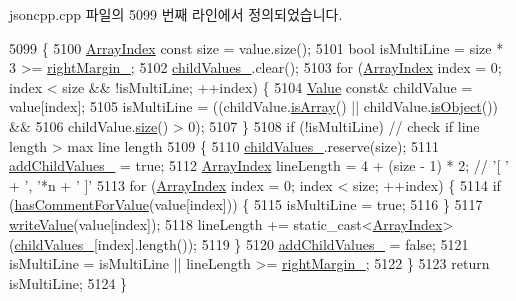 jsoncpp.\+cpp 파일의 5099 번째 라인에서 정의되었습니다.


\begin{DoxyCode}
5099                                                                \{
5100   \hyperlink{namespace_json_a8048e741f2177c3b5d9ede4a5b8c53c2}{ArrayIndex} \textcolor{keyword}{const} size = value.size();
5101   \textcolor{keywordtype}{bool} isMultiLine = size * 3 >= \hyperlink{struct_json_1_1_built_styled_stream_writer_a06a51521ccae20397f52fe3036edc602}{rightMargin\_};
5102   \hyperlink{struct_json_1_1_built_styled_stream_writer_a47d562d7874c5b1e68995bd62f575792}{childValues\_}.clear();
5103   \textcolor{keywordflow}{for} (\hyperlink{namespace_json_a8048e741f2177c3b5d9ede4a5b8c53c2}{ArrayIndex} index = 0; index < size && !isMultiLine; ++index) \{
5104     \hyperlink{class_json_1_1_value}{Value} \textcolor{keyword}{const}& childValue = value[index];
5105     isMultiLine = ((childValue.\hyperlink{class_json_1_1_value_a1627eb9d6568d6d0252fa8bb711c0a59}{isArray}() || childValue.\hyperlink{class_json_1_1_value_a8cf96c0f2a552051fcfc78ffee60e037}{isObject}()) &&
5106                         childValue.\hyperlink{class_json_1_1_value_a0ec2808e1d7efa4e9fad938d6667be44}{size}() > 0);
5107   \}
5108   \textcolor{keywordflow}{if} (!isMultiLine) \textcolor{comment}{// check if line length > max line length}
5109   \{
5110     \hyperlink{struct_json_1_1_built_styled_stream_writer_a47d562d7874c5b1e68995bd62f575792}{childValues\_}.reserve(size);
5111     \hyperlink{struct_json_1_1_built_styled_stream_writer_abed9cc31da503b48798e7cea68c42e16}{addChildValues\_} = \textcolor{keyword}{true};
5112     \hyperlink{namespace_json_a8048e741f2177c3b5d9ede4a5b8c53c2}{ArrayIndex} lineLength = 4 + (size - 1) * 2; \textcolor{comment}{// '[ ' + ', '*n + ' ]'}
5113     \textcolor{keywordflow}{for} (\hyperlink{namespace_json_a8048e741f2177c3b5d9ede4a5b8c53c2}{ArrayIndex} index = 0; index < size; ++index) \{
5114       \textcolor{keywordflow}{if} (\hyperlink{struct_json_1_1_built_styled_stream_writer_a457c2f3c1e8c952caeb60e52477d0c9a}{hasCommentForValue}(value[index])) \{
5115         isMultiLine = \textcolor{keyword}{true};
5116       \}
5117       \hyperlink{struct_json_1_1_built_styled_stream_writer_a7c9da861861e570a51b45f270c9ff150}{writeValue}(value[index]);
5118       lineLength += \textcolor{keyword}{static\_cast<}\hyperlink{namespace_json_a8048e741f2177c3b5d9ede4a5b8c53c2}{ArrayIndex}\textcolor{keyword}{>}(\hyperlink{struct_json_1_1_built_styled_stream_writer_a47d562d7874c5b1e68995bd62f575792}{childValues\_}[index].length());
5119     \}
5120     \hyperlink{struct_json_1_1_built_styled_stream_writer_abed9cc31da503b48798e7cea68c42e16}{addChildValues\_} = \textcolor{keyword}{false};
5121     isMultiLine = isMultiLine || lineLength >= \hyperlink{struct_json_1_1_built_styled_stream_writer_a06a51521ccae20397f52fe3036edc602}{rightMargin\_};
5122   \}
5123   \textcolor{keywordflow}{return} isMultiLine;
5124 \}
\end{DoxyCode}
